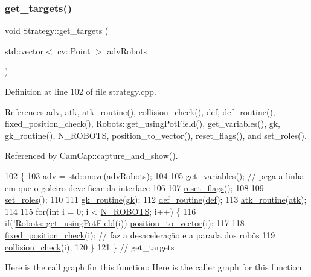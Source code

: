 \subsubsection{\texorpdfstring{get\+\_\+targets()}{get\_targets()}}
{\footnotesize\ttfamily void Strategy\+::get\+\_\+targets (\begin{DoxyParamCaption}\item[{std\+::vector$<$ cv\+::\+Point $>$}]{adv\+Robots }\end{DoxyParamCaption})}



Definition at line 102 of file strategy.\+cpp.



References adv, atk, atk\+\_\+routine(), collision\+\_\+check(), def, def\+\_\+routine(), fixed\+\_\+position\+\_\+check(), Robots\+::get\+\_\+using\+Pot\+Field(), get\+\_\+variables(), gk, gk\+\_\+routine(), N\+\_\+\+R\+O\+B\+O\+TS, position\+\_\+to\+\_\+vector(), reset\+\_\+flags(), and set\+\_\+roles().



Referenced by Cam\+Cap\+::capture\+\_\+and\+\_\+show().


\begin{DoxyCode}
102                                                        \{
103     \hyperlink{class_strategy_a4ebbce7f034aaca32adbd4f9607642d9}{adv} = std::move(advRobots);
104 
105     \hyperlink{class_strategy_aa292ccd0034d6507ffa7d5dc35862a94}{get\_variables}(); \textcolor{comment}{// pega a linha em que o goleiro deve ficar da interface}
106 
107     \hyperlink{class_strategy_a44da3c45d60d32f6ef2d81859d47b2b4}{reset\_flags}();
108 
109     \hyperlink{class_strategy_a35458436b6f9d4f080ce8415af3dc599}{set\_roles}();
110 
111     \hyperlink{class_strategy_a0e93b877f1da0c7a608c5641812f54d4}{gk\_routine}(\hyperlink{class_strategy_a7efb4f780b78ee593649340a7f948c36}{gk});
112     \hyperlink{class_strategy_a304c52736ec76d275adda7eeacdd430c}{def\_routine}(\hyperlink{class_strategy_ade11a007d9479832ddc5e69169e23692}{def});
113     \hyperlink{class_strategy_a7af0ec883fe9e80c31cf030ce203f956}{atk\_routine}(\hyperlink{class_strategy_af06cfb5e28b7a30cfaa312c7a1c051b1}{atk});
114 
115     \textcolor{keywordflow}{for}(\textcolor{keywordtype}{int} i = 0; i < \hyperlink{robots_8hpp_a11f808c4481e347f5ea9a10237470606}{N\_ROBOTS}; i++) \{
116         \textcolor{keywordflow}{if}(!\hyperlink{class_robots_a42f3e3d3b1d8c41ad6180a03427458bf}{Robots::get\_usingPotField}(i)) 
      \hyperlink{class_strategy_afa755796f0301750d616afac02ac935a}{position\_to\_vector}(i);
117 
118         \hyperlink{class_strategy_aabfdf0c3cd206c94e8b37f86bb387a61}{fixed\_position\_check}(i); \textcolor{comment}{// faz a desaceleração e a parada dos robôs}
119         \hyperlink{class_strategy_a8d1fa6e7cb13f7eb135bc853beef462d}{collision\_check}(i);
120     \}
121 \} \textcolor{comment}{// get\_targets}
\end{DoxyCode}
Here is the call graph for this function\+:
Here is the caller graph for this function\+:
\mbox{\label{class_strategy_aa292ccd0034d6507ffa7d5dc35862a94}} 
